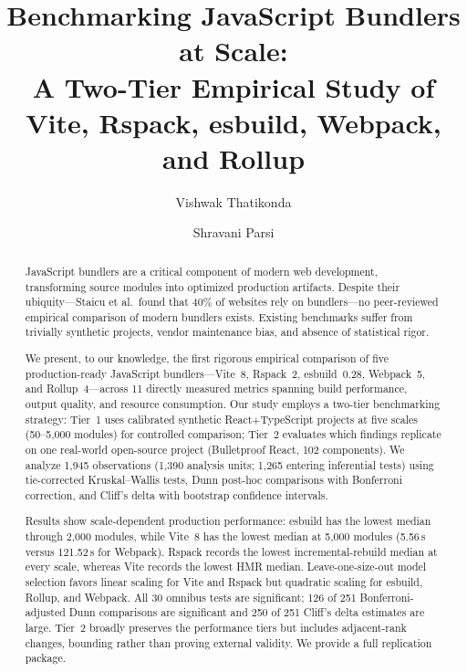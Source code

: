 \documentclass[preprint,12pt]{elsarticle}
\begin{document}
\begin{frontmatter}

\title{Benchmarking JavaScript Bundlers at Scale:\\A Two-Tier Empirical Study of Vite, Rspack, esbuild, Webpack, and Rollup}

\author[addr1]{Vishwak Thatikonda}
\author[addr1]{Shravani Parsi}
\address[addr1]{Independent Researcher}

\begin{abstract}
JavaScript bundlers are a critical component of modern web development, transforming source modules into optimized production artifacts.
Despite their ubiquity---Staicu et al.\ found that 40\% of websites rely on bundlers---no peer-reviewed empirical comparison of modern bundlers exists.
Existing benchmarks suffer from trivially synthetic projects, vendor maintenance bias, and absence of statistical rigor.

We present, to our knowledge, the first rigorous empirical comparison of five production-ready JavaScript bundlers---Vite~8, Rspack~2, esbuild~0.28, Webpack~5, and Rollup~4---across 11 directly measured metrics spanning build performance, output quality, and resource consumption.
Our study employs a two-tier benchmarking strategy: Tier~1 uses calibrated synthetic React+TypeScript projects at five scales (50--5{,}000 modules) for controlled comparison; Tier~2 evaluates which findings replicate on one real-world open-source project (Bulletproof React, 102 components).
We analyze 1{,}945 observations (1{,}390 analysis units; 1{,}265 entering inferential tests) using tie-corrected Kruskal--Wallis tests, Dunn post-hoc comparisons with Bonferroni correction, and Cliff's delta with bootstrap confidence intervals.

Results show scale-dependent production performance: esbuild has the lowest median through 2{,}000 modules, while Vite~8 has the lowest median at 5{,}000 modules (5.56\,s versus 121.52\,s for Webpack).
Rspack records the lowest incremental-rebuild median at every scale, whereas Vite records the lowest HMR median.
Leave-one-size-out model selection favors linear scaling for Vite and Rspack but quadratic scaling for esbuild, Rollup, and Webpack.
All 30 omnibus tests are significant; 126 of 251 Bonferroni-adjusted Dunn comparisons are significant and 250 of 251 Cliff's delta estimates are large.
Tier~2 broadly preserves the performance tiers but includes adjacent-rank changes, bounding rather than proving external validity.
We provide a full replication package.
\end{abstract}


\end{frontmatter}
\end{document}
